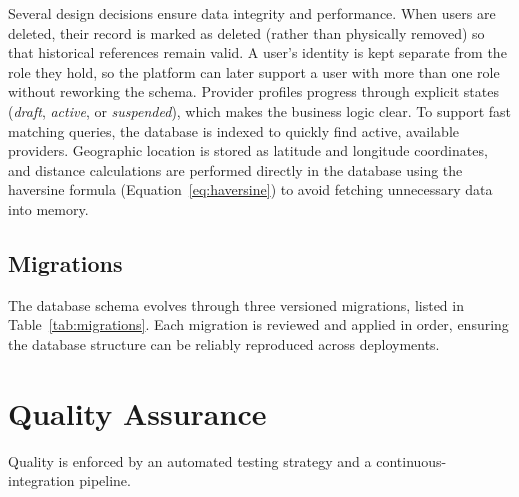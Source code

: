 Several design decisions ensure data integrity and performance. When users are
deleted, their record is marked as deleted (rather than physically removed) so
that historical references remain valid. A user's identity is kept separate from
the role they hold, so the platform can later support a user with more than one
role without reworking the schema. Provider profiles progress through
explicit states (\textit{draft}, \textit{active}, or \textit{suspended}), which
makes the business logic clear. To support fast matching queries, the database
is indexed to quickly find active, available providers. Geographic location is
stored as latitude and longitude coordinates, and distance calculations are
performed directly in the database using the haversine formula
(Equation~\ref{eq:haversine}) to avoid fetching unnecessary data into memory.

\subsection{Migrations}
The database schema evolves through three versioned migrations, listed in
Table~\ref{tab:migrations}. Each migration is reviewed and applied in order,
ensuring the database structure can be reliably reproduced across deployments.

\begin{table}[ht]
	\centering
	\caption{Database migrations applied to date.}
	\label{tab:migrations}
\end{table}

\section{Quality Assurance}
Quality is enforced by an automated testing strategy and a
continuous-integration pipeline.

